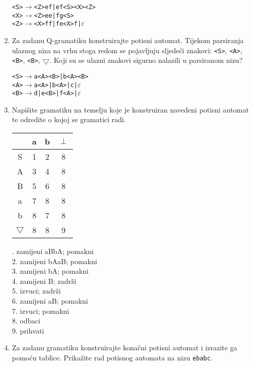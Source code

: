 \documentclass[times, 12pt, utf8]{book}
\begin{document}
\begin{enumerate}[resume]
\begin{alltt}
<S> \(\to\) <Z>ef | ef<S><X><Z>
<X> \(\to\) <Z>ee | fg<S>
<Z> \(\to\) <X>ff | fe<X>f | \(\varepsilon\)
\end{alltt}

\item 
Za zadanu Q-gramatiku konstruirajte potisni automat.
Tijekom parsiranja ulaznog niza na vrhu stoga redom se pojavljuju sljedeći znakovi: \texttt{<S>}, \texttt{<A>}, \texttt{<B>}, \texttt{<B>}, \(\bigtriangledown\).
Koji su se ulazni znakovi sigurno nalazili u parsiranom nizu? \cite[str.~94-95]{udzbenik} \cite{auditorne}

\begin{alltt}
<S> \(\to\) a<A><B> | b<A><B>
<A> \(\to\) a<A> | b<A> | c | \(\varepsilon\)
<B> \(\to\) d | e<B> | f<A> | \(\varepsilon\)
\end{alltt} 

\item 
Napišite gramatiku na temelju koje je konstruiran navedeni potisni automat te odredite o kojoj se gramatici radi. \cite[str.~94-95]{udzbenik} \cite{auditorne}

\begin{tabular}{| c | c | c | c | }
\hline
   & a & b & $\perp$ \\ \hline
 S & 1 & 2 & 8 \\ \hline
 A & 3 & 4 & 8 \\ \hline
 B & 5 & 6 & 8 \\ \hline
 a & 7 & 8 & 8 \\ \hline
 b & 8 & 7 & 8 \\ \hline
 $\bigtriangledown$ & 8 & 8 & 9 \\ \hline
\end{tabular}

. zamijeni aBbA; pomakni \\
2. zamijeni bAaB; pomakni \\
3. zamijeni bA; pomakni \\
4. zamijeni B; zadrži \\
5. izvuci; zadrži \\
6. zamijeni aB; pomakni \\
7. izvuci; pomakni \\
8. odbaci \\
9. prihvati 

\item
Za zadanu gramatiku konstruirajte konačni potisni automat i izrazite ga pomoću tablice.
Prikažite rad potisnog automata na nizu \texttt{ebabc}. \cite[str.~94-95]{udzbenik} \cite{auditorne}


\end{enumerate}
\end{document}
